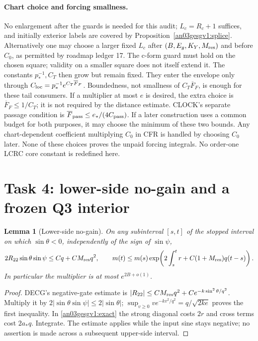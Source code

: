 \documentclass[11pt]{article}
\newtheorem{lemma}[proposition]{Lemma}
\theoremstyle{remark}\newtheorem{remark}[proposition]{Remark}
\begin{document}
\paragraph{Chart choice and forcing smallness.}
No enlargement after the guards is needed for this audit;
$L_c=R_c+1$ suffices, and initially exterior labels are covered
by Proposition~\ref{an03gesgv1:splice}.
Alternatively one may choose a larger fixed $L_c$ after
$(B,E_g,K_Y,M_{\rm res})$ and before $C_0$, as permitted by
roadmap ledger 17. The c-form guard must hold on the chosen
square; validity on a smaller square does not itself extend it.
The constants $p_*^{-1},C_T$ then grow
but remain fixed. They enter the envelope only through
$C_{\rm loc}=p_*^{-1}e^{C_T\overline F_F}$.
Boundedness, not smallness of $C_T\overline F_F$, is enough
for these tail consumers. If a multiplier at most $e$ is
desired, the extra choice is $\overline F_F\le1/C_T$;
it is not required by the distance estimate.
CLOCK's separate passage condition is
$\overline F_{\rm pass}\le e_*/(4C_{\rm pass})$.
If a later construction uses a common budget for both
purposes, it may choose the minimum of these two bounds.
Any chart-dependent coefficient multiplying $C_0$ in CFR
is handled by choosing $C_0$ later. None of these choices
proves the unpaid forcing integrals. No order-one LCRC core
constant is redefined here.

\section{Task 4: lower-side no-gain and a frozen Q3 interior}
\begin{lemma}[Lower-side no-gain]
\label{an03gesgv1:lowernogain}
On any subinterval $[s,t]$ of the stopped interval on which
$\sin\theta<0$, independently of the sign of $\sin\psi$,
\begin{equation}
 2R_{22}\sin\theta\sin\psi\le Cq+CM_{\rm res}q^2,
 \qquad
 m(t)\le m(s)\exp\!\left(2\int_s^tr+
                   C(1+M_{\rm res})q(t-s)\right).
 \label{an03gesgv1:nogain}
\end{equation}
In particular the multiplier is at most $e^{2B+o(1)}$.
\end{lemma}
\begin{proof}
DECG's negative-gate estimate is
$|R_{22}|\le CM_{\rm res}q^2+Ce^{-k\sin^2\theta/q^2}$.
Multiply it by $2|\sin\theta\sin\psi|\le2|\sin\theta|$;
$\sup_{v\ge0}ve^{-kv^2/q^2}=q/\sqrt{2ke}$ proves the first
inequality. In \eqref{an03gesgv1:exact} the strong diagonal
costs $2r$ and cross terms cost $2a_*q$. Integrate.
The estimate applies while the input sine stays negative;
no assertion is made across a subsequent upper-side interval.
\end{proof}
\end{document}
